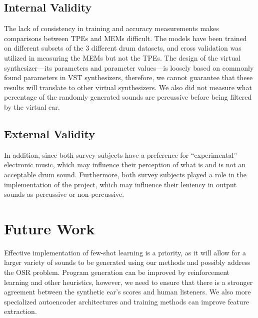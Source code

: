 \documentclass[\main/thesis.tex]{subfiles}
\begin{document}
\subsection{Internal Validity}
 The lack of consistency in training and accuracy measurements makes comparisons between TPEs and MEMs difficult. The models have been trained on different subsets of the 3 different drum datasets, and cross validation was utilized in measuring the MEMs but not the TPEs. The design of the virtual synthesizer---its parameters and parameter values---is loosely based on commonly found parameters in VST synthesizers, therefore, we cannot guarantee that these results will translate to other virtual synthesizers. We also did not measure what percentage of the randomly generated sounds are percussive before being filtered by the virtual ear. 
\subsection{External Validity}
 In addition, since both survey subjects have a preference for \enquote{experimental} electronic music, which may influence their perception of what is and is not an acceptable drum sound. Furthermore, both survey subjects played a role in the implementation of the project, which may influence their leniency in output sounds as percussive or non-percussive. 

  
\section{Future Work} Effective implementation of few-shot learning is a priority, as it will allow for a larger variety of sounds to be generated using our methods and possibly address the OSR problem. Program generation can be improved by reinforcement learning and other heuristics, however, we need to ensure that there is a stronger agreement between the synthetic ear's scores and human listeners. We also more specialized autoencoder architectures and training methods can improve feature extraction.
\end{document}
